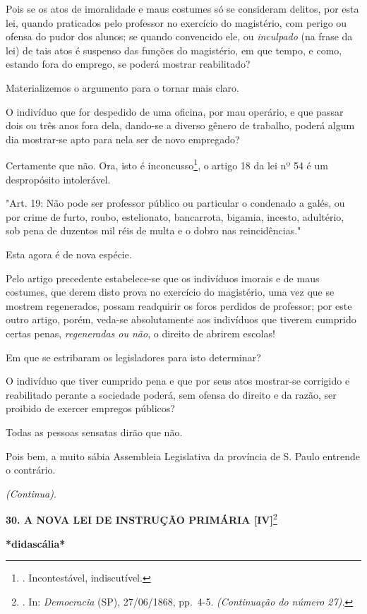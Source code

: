 Pois se os atos de imoralidade e maus costumes só se consideram delitos,
por esta lei, quando praticados pelo professor no exercício do
magistério, com perigo ou ofensa do pudor dos alunos; se quando
convencido ele, ou \emph{inculpado} (na frase da lei) de tais atos é
suspenso das funções do magistério, em que tempo, e como, estando fora
do emprego, se poderá mostrar reabilitado?

Materializemos o argumento para o tornar mais claro.

O indivíduo que for despedido de uma oficina, por mau operário, e que
passar dois ou três anos fora dela, dando-se a diverso gênero de
trabalho, poderá algum dia mostrar-se apto para nela ser de novo
empregado?

Certamente que não. Ora, isto é inconcusso\footnote{. Incontestável,
  indiscutível.}, o artigo 18 da lei nº 54 é um despropósito
intolerável.

"Art. 19: Não pode ser professor público ou particular o condenado a
galés, ou por crime de furto, roubo, estelionato, bancarrota, bigamia,
incesto, adultério, sob pena de duzentos mil réis de multa e o dobro nas
reincidências."

Esta agora é de nova espécie.

Pelo artigo precedente estabelece-se que os indivíduos imorais e de maus
costumes, que derem disto prova no exercício do magistério, uma vez que
se mostrem regenerados, possam readquirir os foros perdidos de
professor; por este outro artigo, porém, veda-se absolutamente aos
indivíduos que tiverem cumprido certas penas, \emph{regeneradas ou não},
o direito de abrirem escolas!

Em que se estribaram os legisladores para isto determinar?

O indivíduo que tiver cumprido pena e que por seus atos mostrar-se
corrigido e reabilitado perante a sociedade poderá, sem ofensa do
direito e da razão, ser proibido de exercer empregos públicos?

Todas as pessoas sensatas dirão que não.

Pois bem, a muito sábia Assembleia Legislativa da província de S. Paulo
entrende o contrário.

\emph{(Continua)}.

\textbf{30. A NOVA LEI DE INSTRUÇÃO PRIMÁRIA {[}IV{]}}\footnote{. In:
  \emph{Democracia} (SP), 27/06/1868, pp.~4-5. \emph{(Continuação do
  número 27).}}

\textbf{*didascália*}

